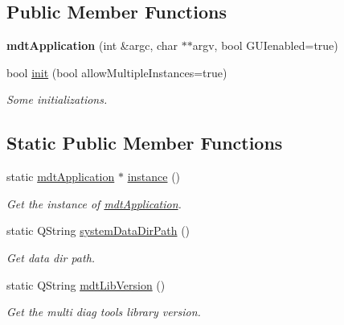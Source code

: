 \subsection*{Public Member Functions}
\begin{DoxyCompactItemize}
\item 
\hypertarget{classmdt_application_ab6268414770ee9239c83677c15a67f75}{
{\bfseries mdtApplication} (int \&argc, char $\ast$$\ast$argv, bool GUIenabled=true)}
\label{classmdt_application_ab6268414770ee9239c83677c15a67f75}

\item 
bool \hyperlink{classmdt_application_a5000b9656a59b3594de2a4ceb4232673}{init} (bool allowMultipleInstances=true)
\begin{DoxyCompactList}\small\item\em Some initializations. \end{DoxyCompactList}\end{DoxyCompactItemize}
\subsection*{Static Public Member Functions}
\begin{DoxyCompactItemize}
\item 
static \hyperlink{classmdt_application}{mdtApplication} $\ast$ \hyperlink{classmdt_application_a365ac79934070b0e5a42d2c7cd9b076d}{instance} ()
\begin{DoxyCompactList}\small\item\em Get the instance of \hyperlink{classmdt_application}{mdtApplication}. \end{DoxyCompactList}\item 
\hypertarget{classmdt_application_af17bb16e420c91af3d0ad1970714388c}{
static QString \hyperlink{classmdt_application_af17bb16e420c91af3d0ad1970714388c}{systemDataDirPath} ()}
\label{classmdt_application_af17bb16e420c91af3d0ad1970714388c}

\begin{DoxyCompactList}\small\item\em Get data dir path. \end{DoxyCompactList}\item 
\hypertarget{classmdt_application_ad5318086812dad2c2870e294703caa51}{
static QString \hyperlink{classmdt_application_ad5318086812dad2c2870e294703caa51}{mdtLibVersion} ()}
\label{classmdt_application_ad5318086812dad2c2870e294703caa51}

\begin{DoxyCompactList}\small\item\em Get the multi diag tools library version. \end{DoxyCompactList}\end{DoxyCompactItemize}


